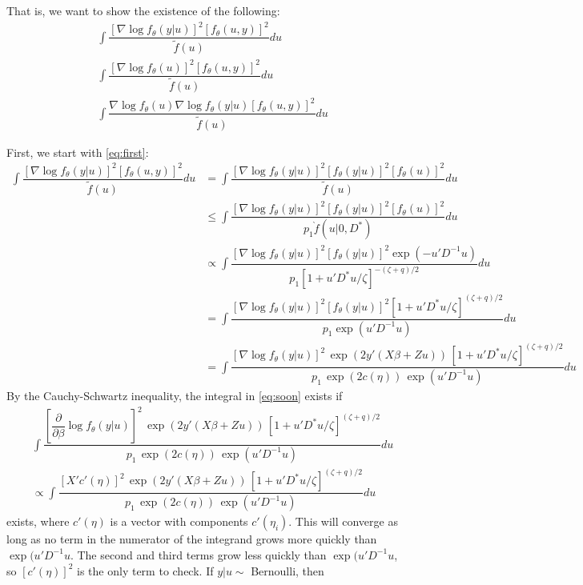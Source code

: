 \documentclass{article}
\begin{document}
That is, we want to show the existence of the following:
\begin{align}
&\int \dfrac{ \left[ \nabla \log f_\theta (y|u) \right]^2 \left[ f_\theta(u,y)\right]^2}{\tilde{f}(u)} du \label{eq:first} \\
&\int \dfrac{ \left[ \nabla \log f_\theta (u) \right]^2 \left[ f_\theta(u,y)\right]^2}{\tilde{f}(u)} du \label{eq:second} \\
&\int \dfrac{  \nabla \log f_\theta (u)  \nabla \log f_\theta (y|u)  \left[ f_\theta(u,y)\right]^2}{\tilde{f}(u)} du \label{eq:third} 
\end{align}

First, we start with \eqref{eq:first}:
\begin{align}
\int \dfrac{ \left[ \nabla \log f_\theta (y|u) \right]^2 \left[ f_\theta(u,y)\right]^2}{\tilde{f}(u)} du 
&=\int \dfrac{ \left[ \nabla \log f_\theta (y|u) \right]^2 \left[ f_\theta(y|u)\right]^2 \left[ f_\theta(u)\right]^2}{\tilde{f}(u)} du \\
&\leq \int \dfrac{ \left[ \nabla \log f_\theta (y|u) \right]^2 \left[ f_\theta(y|u)\right]^2 \left[ f_\theta(u)\right]^2}{p_1\grave{f}(u|0,D^*)} du \\
&\propto \int \dfrac{ \left[ \nabla \log f_\theta (y|u) \right]^2 \left[ f_\theta(y|u)\right]^2 \exp(-u'D^{-1}u)}{p_1\left[ 1+u'D^*u/\zeta  \right]^{-(\zeta+q)/2}} du \\
&= \int \dfrac{ \left[ \nabla \log f_\theta (y|u) \right]^2 \left[ f_\theta(y|u)\right]^2 \left[ 1+u'D^*u/\zeta  \right]^{(\zeta+q)/2} }{p_1 \exp(u'D^{-1}u)} du \\
&= \int \dfrac{ \left[ \nabla \log f_\theta (y|u) \right]^2 \, \exp(2y'(X \beta+Zu)) \,  \left[ 1+u'D^*u/\zeta  \right]^{(\zeta+q)/2} }{ p_1 \, \exp(2 c(\eta)) \,\exp(u'D^{-1}u)} du \label{eq:soon}
\end{align}
By the Cauchy-Schwartz inequality, the integral in \eqref{eq:soon} exists if
\begin{align}
 & \int \dfrac{ \left[\dfrac{\partial}{\partial \beta} \log f_\theta (y|u) \right]^2 \, \exp(2y'(X \beta+Zu)) \,  \left[ 1+u'D^*u/\zeta  \right]^{(\zeta+q)/2} }{ p_1 \, \exp(2 c(\eta)) \,\exp(u'D^{-1}u)} du \nonumber \\
&\propto  \int \dfrac{ \left[X' c'(\eta) \right]^2 \, \exp(2y'(X \beta+Zu)) \,  \left[ 1+u'D^*u/\zeta  \right]^{(\zeta+q)/2} }{ p_1 \, \exp(2 c(\eta)) \,\exp(u'D^{-1}u)} du \label{eq:soon2}
\end{align}
exists, where $c'(\eta)$ is a vector with components $c'(\eta_i)$.  This will converge as long as no term in the numerator of the integrand grows more quickly than $\exp(u'D^{-1}u$. The second and third terms grow less quickly than $\exp(u'D^{-1}u$, so $\left[ c'(\eta)\right]^2$ is the only term to check.  If $y|u \sim$ Bernoulli, then 
\end{document}
